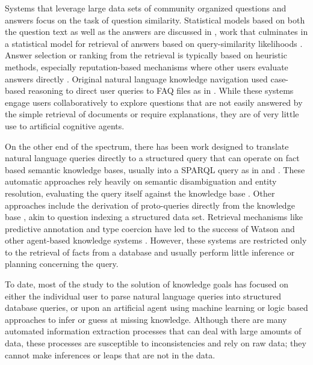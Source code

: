 \documentclass[11pt,letterpaper]{article}
\begin{document}
Systems that leverage large data sets of community organized questions and answers focus on the task of question similarity. Statistical models based on both the question text as well as the answers are discussed in \cite{jeon_finding_2005,jeon_finding_2005-1}, work that culminates in a statistical model for retrieval of answers based on query-similarity likelihoods \cite{xue_retrieval_2008}. Answer selection or ranking from the retrieval is typically based on heuristic methods, especially reputation-based mechanisms where other users evaluate answers directly \cite{wang_wisdom_2013}. Original natural language knowledge navigation used case-based reasoning to direct user queries to FAQ files as in \cite{hammond_faq_1995,burke_question_1997,burke_natural_1997}. While these systems engage users collaboratively to explore questions that are not easily answered by the simple retrieval of documents or require explanations, they are of very little use to artificial cognitive agents.

On the other end of the spectrum, there has been work designed to translate natural language queries directly to a structured query that can operate on fact based semantic knowledge bases, usually into a SPARQL query as in \cite{yahya_natural_2012,unger_template-based_2012} and \cite{berant_semantic_2013}. These automatic approaches rely heavily on semantic disambiguation and entity resolution, evaluating the query itself against the knowledge base \cite{zheng_entity_2012}. Other approaches include the derivation of proto-queries directly from the knowledge base \cite{frank_question_2007}, akin to question indexing a structured data set. Retrieval mechanisms like predictive annotation and type coercion have led to the success of Watson and other agent-based knowledge systems \cite{prager_question_2006,kalyanpur_leveraging_2011}. However, these systems are restricted only to the retrieval of facts from a database and usually perform little inference or planning concerning the query.

To date, most of the study to the solution of knowledge goals has focused on either the individual user to parse natural language queries into structured database queries, or upon an artificial agent using machine learning or logic based approaches to infer or guess at missing knowledge. Although there are many automated information extraction processes that can deal with large amounts of data, these processes are susceptible to inconsistencies and rely on raw data; they cannot make inferences or leaps that are not in the data.
\end{document}
